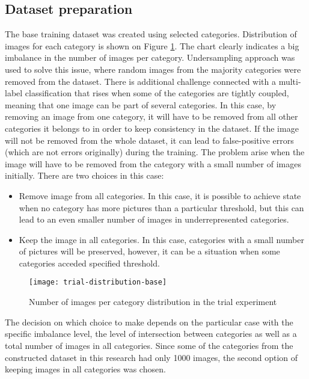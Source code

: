     \subsection{Dataset preparation}
    \label{sec:trial-dataset-prep}
    The base training dataset was created using selected categories. Distribution of images for each category is shown on Figure \ref{fig:trial-distribution-base}. The chart clearly indicates a big imbalance in the number of images per category. Undersampling approach was used to solve this issue, where random images from the majority categories were removed from the dataset. There is additional challenge connected with a multi-label classification that rises when some of the categories are tightly coupled, meaning that one image can be part of several categories. In this case, by removing an image from one category, it will have to be removed from all other categories it belongs to in order to keep consistency in the dataset. If the image will not be removed from the whole dataset, it can lead to false-positive errors (which are not errors originally) during the training. The problem arise when the image will have to be removed from the category with a small number of images initially. There are two choices in this case:
    
    \begin{itemize}
        \item Remove image from all categories. In this case, it is possible to achieve state when no category has more pictures than a particular threshold, but this can lead to an even smaller number of images in underrepresented categories.
        \item Keep the image in all categories. In this case, categories with a small number of pictures will be preserved, however, it can be a situation when some categories acceded specified threshold.
    \end{itemize}
    
    \begin{figure}[h!]
        \centering
        \texttt{[image: trial-distribution-base]}
        \caption{Number of images per category distribution in the trial experiment}
        \label{fig:trial-distribution-base}
    \end{figure}
    
    The decision on which choice to make depends on the particular case with the specific imbalance level, the level of intersection between categories as well as a total number of images in all categories. Since some of the categories from the constructed dataset in this research had only 1000 images, the second option of keeping images in all categories was chosen.
    
